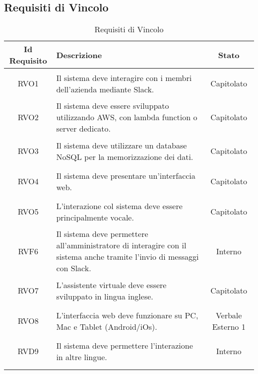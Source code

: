 \subsection{Requisiti di Vincolo}
\normalsize
\begin{longtable}{|c|>{\centering}m{7cm}|c|}
\hline
\textbf{Id Requisito} & \textbf{Descrizione} & \textbf{Stato}\\
\hline
\endhead\hypertarget{RVO1}{RVO1} & Il sistema deve interagire con i membri dell'azienda mediante Slack. & Capitolato\\ \hline
\hypertarget{RVO2}{RVO2} & Il sistema deve essere sviluppato utilizzando AWS, con lambda function o server dedicato. & Capitolato\\ \hline
\hypertarget{RVO3}{RVO3} & Il sistema deve utilizzare un database NoSQL per la memorizzazione dei dati. & Capitolato\\ \hline
\hypertarget{RVO4}{RVO4} & Il sistema deve presentare un'interfaccia web. & Capitolato\\ \hline
\hypertarget{RVO5}{RVO5} & L'interazione col sistema deve essere principalmente vocale. & Capitolato\\ \hline
\hypertarget{RVF6}{RVF6} & Il sistema deve permettere all'amministratore di interagire con il sistema anche tramite l'invio di messaggi con Slack. & Interno\\ \hline
\hypertarget{RVO7}{RVO7} & L'assistente virtuale deve essere sviluppato in lingua inglese. & Capitolato\\ \hline
\hypertarget{RVO8}{RVO8} & L'interfaccia web deve funzionare su PC, Mac e Tablet (Android/iOs). & Verbale Esterno 1\\ \hline
\hypertarget{RVD9}{RVD9} & Il sistema deve permettere l'interazione in altre lingue. & Interno\\ \hline

\caption[Requisiti di Vincolo]{Requisiti di Vincolo}
\label{tabella:req3}
\end{longtable}
\clearpage
